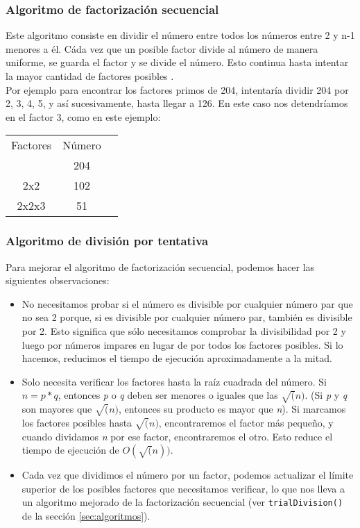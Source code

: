 \documentclass{article}
\begin{document}
\subsubsection{Algoritmo de factorización secuencial}

Este algoritmo consiste en dividir el número entre todos los números entre 2 y
n-1 menores a él. Cáda vez que un posible factor divide al número de manera
uniforme, se guarda el factor y se divide el número. Esto continua hasta
intentar la mayor cantidad de factores posibles \cite{stephens2019essential}.\\

Por ejemplo para encontrar los factores primos de 204, intentaría dividir 204
por 2, 3, 4, 5, y así sucesivamente, hasta llegar a 126. En este caso nos
detendríamos en el factor 3, como en este ejemplo:

\begin{center}
    \begin{tabular}{ c c c }
     Factores & Número \\ 
              & 204    \\
     2x2      & 102    \\
     2x2x3    & 51
    \end{tabular}
    \end{center}

\subsubsection{Algoritmo de división por tentativa}

Para mejorar el algoritmo de factorización secuencial, podemos hacer las
siguientes observaciones:

\begin{itemize}
    \item No necesitamos probar si el número es divisible por cualquier número par que
    no sea 2 porque, si es divisible por cualquier número par, también es divisible
    por 2. Esto significa que sólo necesitamos comprobar la divisibilidad por 2 y luego
    por números impares en lugar de por todos los factores posibles. Si lo hacemos,
    reducimos el tiempo de ejecución aproximadamente a la mitad.

    \item Solo necesita verificar los factores hasta la raíz cuadrada del número. Si
    $ n= p*q $, entonces \textit{p}  o \textit{q} deben ser menores o iguales
    que las $\sqrt(n)$. (Si \textit{p}  y \textit{q} son mayores que $\sqrt(n)$,
    entonces su producto es mayor que \textit{n}). Si marcamos los factores posibles
    hasta $\sqrt(n)$, encontraremos el factor más pequeño, y cuando dividamos
    \textit{n} por ese factor, encontraremos el otro. Esto reduce el tiempo de
    ejecución de $O(\sqrt(n))$.

    \item Cada vez que dividimos el número por un factor, podemos actualizar el
    límite superior de los posibles factores que necesitamos verificar, lo que nos
    lleva a un algoritmo mejorado de la factorización secuencial (ver
    \texttt{trialDivision()} de la sección \ref{sec:algoritmos}).

\end{itemize}
\end{document}
